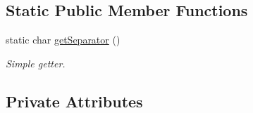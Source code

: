 \subsection*{Static Public Member Functions}
\begin{DoxyCompactItemize}
\item 
static char \hyperlink{class_ontology_1_1_data_property_adf0cae9ddf1db737f1ddeebd803e9c95}{getSeparator} ()
\begin{DoxyCompactList}\small\item\em Simple getter. \end{DoxyCompactList}\end{DoxyCompactItemize}
\subsection*{Private Attributes}
